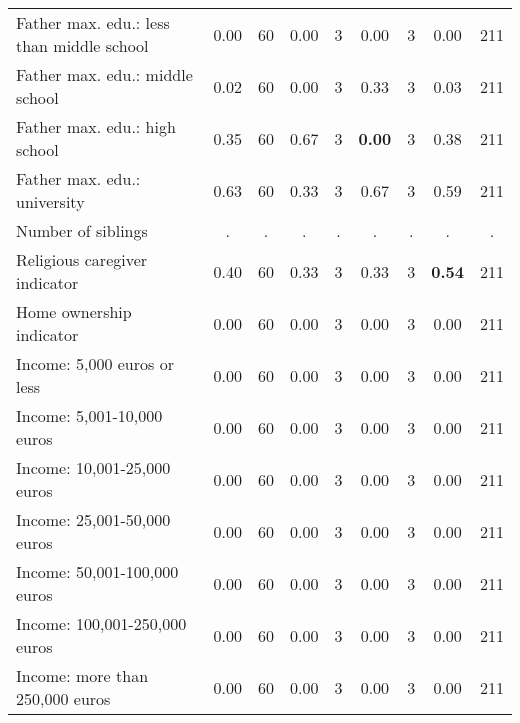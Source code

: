 \begin{tabular}{l c c c c c c c c}
Father max. edu.: less than middle school &      0.00 &        60 &      0.00 &         3 &      0.00 &         3 &      0.00 &       211 \\
Father max. edu.: middle school &      0.02 &        60 &      0.00 &         3 &      0.33 &         3 &      0.03 &       211 \\
Father max. edu.: high school &      0.35 &        60 &      0.67 &         3 & \textbf{     0.00} &         3 &      0.38 &       211 \\
Father max. edu.: university &      0.63 &        60 &      0.33 &         3 &      0.67 &         3 &      0.59 &       211 \\
Number of siblings &         . & . &         . & . &         . & . &         . & . \\
Religious caregiver indicator &      0.40 &        60 &      0.33 &         3 &      0.33 &         3 & \textbf{     0.54} &       211 \\
Home ownership indicator &      0.00 &        60 &      0.00 &         3 &      0.00 &         3 &      0.00 &       211 \\
Income: 5,000 euros or less &      0.00 &        60 &      0.00 &         3 &      0.00 &         3 &      0.00 &       211 \\
Income: 5,001-10,000 euros &      0.00 &        60 &      0.00 &         3 &      0.00 &         3 &      0.00 &       211 \\
Income: 10,001-25,000 euros &      0.00 &        60 &      0.00 &         3 &      0.00 &         3 &      0.00 &       211 \\
Income: 25,001-50,000 euros &      0.00 &        60 &      0.00 &         3 &      0.00 &         3 &      0.00 &       211 \\
Income: 50,001-100,000 euros &      0.00 &        60 &      0.00 &         3 &      0.00 &         3 &      0.00 &       211 \\
Income: 100,001-250,000 euros &      0.00 &        60 &      0.00 &         3 &      0.00 &         3 &      0.00 &       211 \\
Income: more than 250,000 euros &      0.00 &        60 &      0.00 &         3 &      0.00 &         3 &      0.00 &       211 \\
\bottomrule
\end{tabular}
